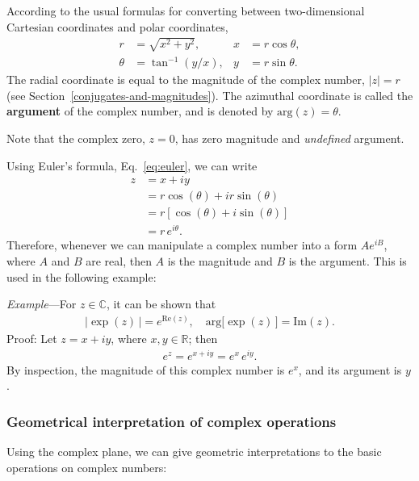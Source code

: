 \documentclass[10pt,a4paper]{article}
\begin{document}
According to the usual formulas for converting between two-dimensional
Cartesian coordinates and polar coordinates,
\begin{align}
  r &= \sqrt{x^2 + y^2}, & x &= r\cos\theta, \\
  \theta &= \tan^{-1}(y/x), & y &= r\sin\theta.
\end{align}
The radial coordinate is equal to the magnitude of the complex number,
$|z| = r$ (see Section~\ref{conjugates-and-magnitudes}).  The
azimuthal coordinate is called the \textbf{argument} of the complex
number, and is denoted by $\mathrm{arg}(z) = \theta$.

Note that the complex zero, $z = 0$, has zero magnitude and
\textit{undefined} argument.

Using Euler's formula, Eq.~\eqref{eq:euler}, we can write
\begin{align}
  z &= x + i y \\
  &= r\cos(\theta) + i r\sin(\theta)\\
  &= r \left[\cos(\theta) + i \sin(\theta)\right] \\
  &= r \, e^{i\theta}.
\end{align}
Therefore, whenever we can manipulate a complex number into a form $A
e^{iB}$, where $A$ and $B$ are real, then $A$ is the magnitude and $B$
is the argument.  This is used in the following example:

\begin{framed}\noindent
  \textit{Example}---For $z \in \mathbb{C}$, it can be shown that
  \begin{align}
    \displaystyle \big|\exp(z)\,\big| = e^{\mathrm{Re}(z)}, \quad \mathrm{arg}\big[\exp(z)\,\big] = \mathrm{Im}(z).
  \end{align}
  Proof: Let $z = x + i y$, where $x, y \in \mathbb{R}$; then
  \begin{align}
    e^{z} = e^{x + i y} = e^x \, e^{iy}.
  \end{align}
  By inspection, the magnitude of this complex number is $e^x$, and
  its argument is $y$.
\end{framed}

\subsubsection{Geometrical interpretation of complex operations}
\label{geometrical-interpretation-of-complex-operations}

Using the complex plane, we can give geometric interpretations to the basic operations on complex numbers: 
\end{document}
